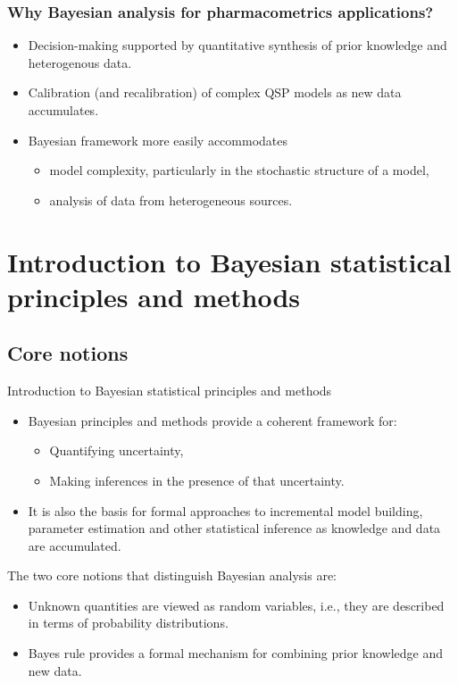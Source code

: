 \documentclass[handout]{beamer}
\begin{document}
\begin{frame}
  \frametitle{Why Bayesian analysis for pharmacometrics applications?}
  
  \begin{itemize}
  \item Decision-making supported by quantitative synthesis of prior
    knowledge and heterogenous data.
  \item Calibration (and recalibration) of complex QSP models as new
    data accumulates.
  \item Bayesian framework more easily accommodates
    \begin{itemize}
    \item model complexity, particularly in the stochastic structure
      of a model,
    \item analysis of data from heterogeneous sources.
    \end{itemize}
  \end{itemize}

\end{frame}

\section{Introduction to Bayesian statistical principles and methods}

\subsection{Core notions}

\begin{frame}{Introduction to Bayesian statistical principles and
    methods}

  \begin{itemize}
  \item Bayesian principles and methods provide a coherent framework
    for:
    \begin{itemize}
    \item Quantifying uncertainty, 
\item Making inferences in the presence
      of that uncertainty.
    \end{itemize}
  \item It is also the basis for formal approaches to incremental
    model building, parameter estimation and other statistical
    inference as knowledge and data are accumulated.
  \end{itemize}

\begin{alertblock}{The two core notions that distinguish Bayesian analysis are:}
  \begin{itemize}
\item Unknown quantities are viewed as random variables, i.e., they are described in terms of probability distributions.
\item Bayes rule provides a formal mechanism for combining prior knowledge and new data. 
  \end{itemize}
\end{alertblock}

\end{frame}
\end{document}
